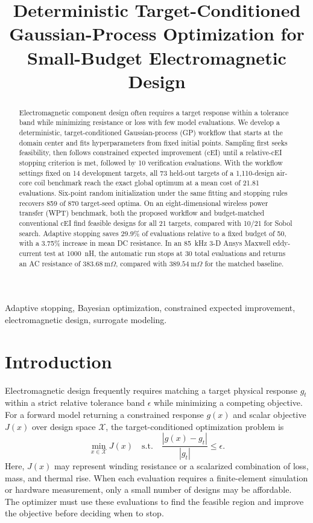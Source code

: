 \documentclass[10pt,conference,letterpaper]{IEEEtran}
\title{Deterministic Target-Conditioned Gaussian-Process Optimization for Small-Budget Electromagnetic Design}
\author{\IEEEauthorblockN{Le Dong}
\IEEEauthorblockA{\textit{School of Electrical Engineering}\\
\textit{Xi'an Jiaotong University}\\
Xi'an, Shaanxi 710049, China\\
\texttt{leroi\_2024@stu.xjtu.edu.cn}}}
\begin{document}
\maketitle

\begin{abstract}
Electromagnetic component design often requires a target response within a tolerance band while minimizing resistance or loss with few model evaluations. We develop a deterministic, target-conditioned Gaussian-process (GP) workflow that starts at the domain center and fits hyperparameters from fixed initial points. Sampling first seeks feasibility, then follows constrained expected improvement (cEI) until a relative-cEI stopping criterion is met, followed by 10 verification evaluations. With the workflow settings fixed on 14 development targets, all 73 held-out targets of a 1,110-design air-core coil benchmark reach the exact global optimum at a mean cost of 21.81 evaluations. Six-point random initialization under the same fitting and stopping rules recovers 859 of 870 target-seed optima. On an eight-dimensional wireless power transfer (WPT) benchmark, both the proposed workflow and budget-matched conventional cEI find feasible designs for all 21 targets, compared with 10/21 for Sobol search. Adaptive stopping saves 29.9\% of evaluations relative to a fixed budget of 50, with a 3.75\% increase in mean DC resistance. In an 85~kHz 3-D Ansys Maxwell eddy-current test at 1000~nH, the automatic run stops at 30 total evaluations and returns an AC resistance of $383.68~\mathrm{m}\Omega$, compared with $389.54~\mathrm{m}\Omega$ for the matched baseline.
\end{abstract}

\begin{IEEEkeywords}
Adaptive stopping, Bayesian optimization, constrained expected improvement, electromagnetic design, surrogate modeling.
\end{IEEEkeywords}

\section{Introduction}
Electromagnetic design frequently requires matching a target physical response $g_t$ within a strict relative tolerance band $\epsilon$ while minimizing a competing objective. For a forward model returning a constrained response $g(x)$ and scalar objective $J(x)$ over design space $\mathcal X$, the target-conditioned optimization problem is
\begin{equation}
 \min_{x\in\mathcal X}J(x)\quad\mathrm{s.t.}\quad
 \frac{|g(x)-g_t|}{|g_t|}\leq\epsilon .
 \label{eq:problem}
\end{equation}
Here, $J(x)$ may represent winding resistance or a scalarized combination of loss, mass, and thermal rise. When each evaluation requires a finite-element simulation or hardware measurement, only a small number of designs may be affordable. The optimizer must use these evaluations to find the feasible region and improve the objective before deciding when to stop.
\end{document}
